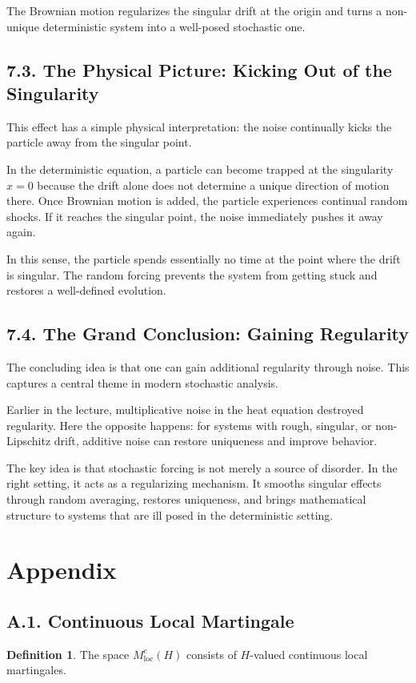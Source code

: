 \documentclass[11pt]{article}
\theoremstyle{definition}
\newtheorem{definition}{Definition}
\theoremstyle{remark}
\begin{document}
The Brownian motion regularizes the singular drift at the origin and turns a non-unique deterministic system into a well-posed stochastic one.

\subsection*{7.3. The Physical Picture: Kicking Out of the Singularity}
This effect has a simple physical interpretation: the noise continually kicks the particle away from the singular point.

In the deterministic equation, a particle can become trapped at the singularity \(x=0\) because the drift alone does not determine a unique direction of motion there. Once Brownian motion is added, the particle experiences continual random shocks. If it reaches the singular point, the noise immediately pushes it away again.

In this sense, the particle spends essentially no time at the point where the drift is singular. The random forcing prevents the system from getting stuck and restores a well-defined evolution.

\subsection*{7.4. The Grand Conclusion: Gaining Regularity}
The concluding idea is that one can gain additional regularity through noise. This captures a central theme in modern stochastic analysis.

Earlier in the lecture, multiplicative noise in the heat equation destroyed regularity. Here the opposite happens: for systems with rough, singular, or non-Lipschitz drift, additive noise can restore uniqueness and improve behavior.

The key idea is that stochastic forcing is not merely a source of disorder. In the right setting, it acts as a regularizing mechanism. It smooths singular effects through random averaging, restores uniqueness, and brings mathematical structure to systems that are ill posed in the deterministic setting.

\section*{Appendix}

\subsection*{A.1. Continuous Local Martingale}
\begin{definition}
The space \(M_{\mathrm{loc}}^c(H)\) consists of \(H\)-valued continuous local martingales.
\end{definition}
\end{document}
